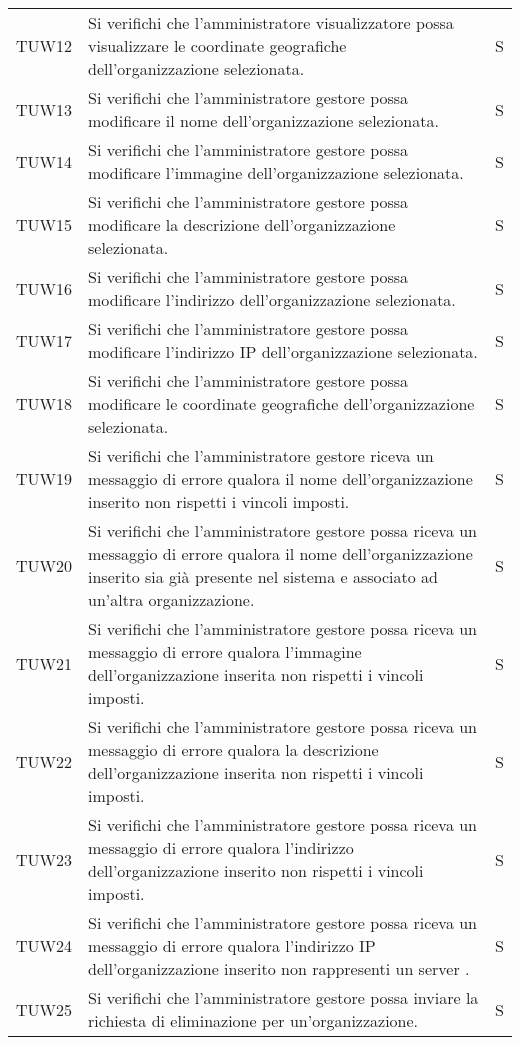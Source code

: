 {\begin{longtable}{ c C{13cm} C{1cm}}
TUW12 & Si verifichi che l'amministratore visualizzatore possa visualizzare le coordinate geografiche dell'organizzazione selezionata. & S \\
TUW13 & Si verifichi che l'amministratore gestore possa modificare il nome dell'organizzazione selezionata. & S \\
TUW14 & Si verifichi che l'amministratore gestore possa modificare l’immagine dell'organizzazione selezionata. & S \\
TUW15 & Si verifichi che l'amministratore gestore possa modificare la descrizione dell'organizzazione selezionata. & S \\
TUW16 & Si verifichi che l'amministratore gestore possa modificare l’indirizzo dell'organizzazione selezionata. & S \\
TUW17 & Si verifichi che l'amministratore gestore possa modificare l’indirizzo IP dell'organizzazione selezionata. & S \\
TUW18 & Si verifichi che l'amministratore gestore possa modificare le coordinate geografiche dell'organizzazione selezionata. & S \\
TUW19 & Si verifichi che l'amministratore gestore riceva un messaggio di errore qualora il nome dell'organizzazione inserito non rispetti i vincoli imposti. & S \\
TUW20 & Si verifichi che l'amministratore gestore possa riceva un messaggio di errore qualora il nome dell'organizzazione inserito sia già presente nel sistema e associato ad un'altra organizzazione. & S \\
TUW21 & Si verifichi che l'amministratore gestore possa riceva un messaggio di errore qualora l'immagine dell'organizzazione inserita non rispetti i vincoli imposti. & S \\
TUW22 & Si verifichi che l'amministratore gestore possa riceva un messaggio di errore qualora la descrizione dell'organizzazione inserita non rispetti i vincoli imposti. & S \\
TUW23 & Si verifichi che l'amministratore gestore possa riceva un messaggio di errore qualora l'indirizzo dell'organizzazione inserito non rispetti i vincoli imposti. & S \\
TUW24 & Si verifichi che l'amministratore gestore possa riceva un messaggio di errore qualora l'indirizzo IP dell'organizzazione inserito non rappresenti un server . & S \\
TUW25 & Si verifichi che l'amministratore gestore possa inviare la richiesta di eliminazione per un'organizzazione. & S \\

\end{longtable}}
